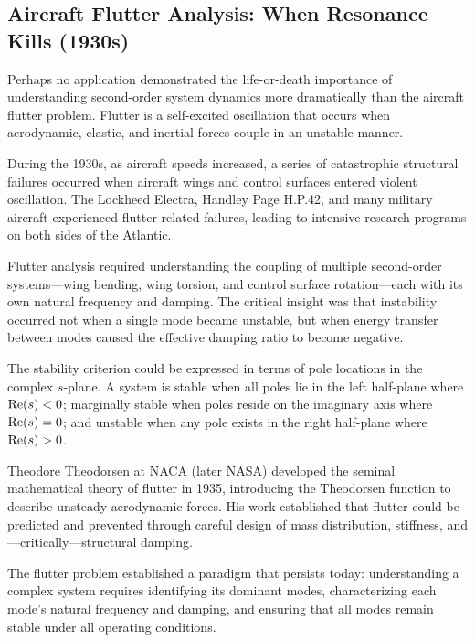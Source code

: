 \subsection{Aircraft Flutter Analysis: When Resonance Kills (1930s)}

Perhaps no application demonstrated the life-or-death importance of understanding second-order system dynamics more dramatically than the aircraft flutter problem. Flutter is a self-excited oscillation that occurs when aerodynamic, elastic, and inertial forces couple in an unstable manner.

\begin{historicalbox}
During the 1930s, as aircraft speeds increased, a series of catastrophic structural failures occurred when aircraft wings and control surfaces entered violent oscillation. The Lockheed Electra, Handley Page H.P.42, and many military aircraft experienced flutter-related failures, leading to intensive research programs on both sides of the Atlantic.
\end{historicalbox}

Flutter analysis required understanding the coupling of multiple second-order systems---wing bending, wing torsion, and control surface rotation---each with its own natural frequency and damping. The critical insight was that instability occurred not when a single mode became unstable, but when energy transfer between modes caused the effective damping ratio to become negative.

The stability criterion could be expressed in terms of pole locations in the complex $s$-plane. A system is stable when all poles lie in the left half-plane where $\mathrm{Re}(s) < 0$; marginally stable when poles reside on the imaginary axis where $\mathrm{Re}(s) = 0$; and unstable when any pole exists in the right half-plane where $\mathrm{Re}(s) > 0$.

Theodore Theodorsen at NACA (later NASA) developed the seminal mathematical theory of flutter in 1935, introducing the Theodorsen function to describe unsteady aerodynamic forces. His work established that flutter could be predicted and prevented through careful design of mass distribution, stiffness, and---critically---structural damping.

The flutter problem established a paradigm that persists today: understanding a complex system requires identifying its dominant modes, characterizing each mode's natural frequency and damping, and ensuring that all modes remain stable under all operating conditions.

